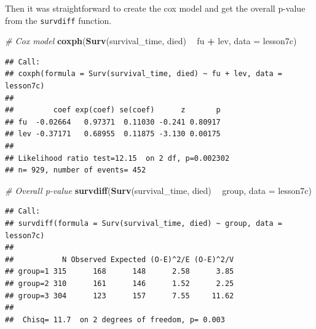 \documentclass[]{book}
\newenvironment{Shaded}{\begin{snugshade}}{\end{snugshade}}
\newcommand{\CommentTok}[1]{\textcolor[rgb]{0.56,0.35,0.01}{\textit{#1}}}
\newcommand{\DataTypeTok}[1]{\textcolor[rgb]{0.13,0.29,0.53}{#1}}
\newcommand{\DecValTok}[1]{\textcolor[rgb]{0.00,0.00,0.81}{#1}}
\newcommand{\KeywordTok}[1]{\textcolor[rgb]{0.13,0.29,0.53}{\textbf{#1}}}
\newcommand{\NormalTok}[1]{#1}
\newcommand{\OperatorTok}[1]{\textcolor[rgb]{0.81,0.36,0.00}{\textbf{#1}}}
\newcommand{\StringTok}[1]{\textcolor[rgb]{0.31,0.60,0.02}{#1}}
\begin{document}
\begin{Shaded}
\end{Shaded}

Then it was straightforward to create the cox model and get the overall p-value from the \texttt{survdiff} function.

\begin{Shaded}
\begin{Highlighting}[]
\CommentTok{# Cox model}
\KeywordTok{coxph}\NormalTok{(}\KeywordTok{Surv}\NormalTok{(survival_time, died) }\OperatorTok{~}\StringTok{ }\NormalTok{fu }\OperatorTok{+}\StringTok{ }\NormalTok{lev, }\DataTypeTok{data =}\NormalTok{ lesson7c)}
\end{Highlighting}
\end{Shaded}

\begin{verbatim}
## Call:
## coxph(formula = Surv(survival_time, died) ~ fu + lev, data = lesson7c)
## 
##         coef exp(coef) se(coef)      z       p
## fu  -0.02664   0.97371  0.11030 -0.241 0.80917
## lev -0.37171   0.68955  0.11875 -3.130 0.00175
## 
## Likelihood ratio test=12.15  on 2 df, p=0.002302
## n= 929, number of events= 452
\end{verbatim}

\begin{Shaded}
\begin{Highlighting}[]
\CommentTok{# Overall p-value}
\KeywordTok{survdiff}\NormalTok{(}\KeywordTok{Surv}\NormalTok{(survival_time, died) }\OperatorTok{~}\StringTok{ }\NormalTok{group, }\DataTypeTok{data =}\NormalTok{ lesson7c)}
\end{Highlighting}
\end{Shaded}

\begin{verbatim}
## Call:
## survdiff(formula = Surv(survival_time, died) ~ group, data = lesson7c)
## 
##           N Observed Expected (O-E)^2/E (O-E)^2/V
## group=1 315      168      148      2.58      3.85
## group=2 310      161      146      1.52      2.25
## group=3 304      123      157      7.55     11.62
## 
##  Chisq= 11.7  on 2 degrees of freedom, p= 0.003
\end{verbatim}
\end{document}
